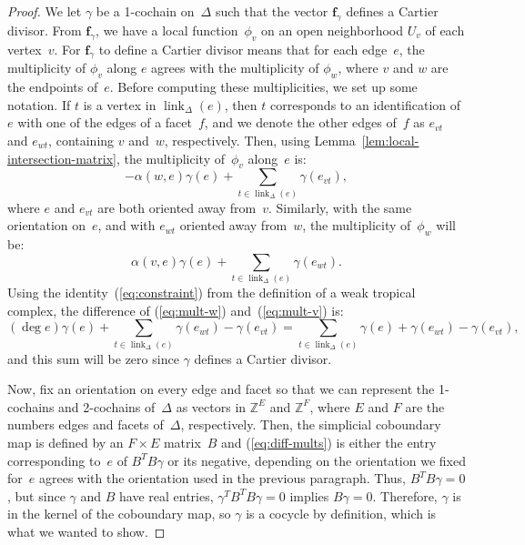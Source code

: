 \documentclass[11pt]{amsart}
\theoremstyle{definition}
\newcommand{\bff}{\mathbf f}
\newcommand{\link}{\operatorname{link}}
\newcommand{\ZZ}{\mathbb Z}
\begin{document}
\begin{proof}
We let $\gamma$ be a 1-cochain on~$\Delta$ such that the vector $\bff_\gamma$
defines a Cartier divisor. From $\bff_\gamma$, we have a local function~$\phi_v$
on an open neighborhood $U_v$ of each vertex~$v$. For $\bff_\gamma$ to define a
Cartier divisor means that for each edge~$e$, the multiplicity of $\phi_v$ along
$e$ agrees with the multiplicity of $\phi_w$, where $v$ and $w$ are the
endpoints of~$e$. Before computing these multiplicities, we set up some
notation. If
$t$ is a vertex in $\link_\Delta(e)$, then $t$ corresponds to an identification
of $e$ with one of the edges of a facet~$f$, and we denote the other edges
of~$f$ as $e_{vt}$ and $e_{wt}$, containing $v$ and~$w$, respectively.
Then, using Lemma~\ref{lem:local-intersection-matrix}, the multiplicity of~$\phi_v$ along~$e$
is:
\begin{equation}\label{eq:mult-v}
-\alpha(w, e) \gamma(e) + \sum_{t \in \link_\Delta(e)} \gamma(e_{vt}),
\end{equation}
where $e$ and $e_{vt}$ are both oriented away from~$v$. Similarly, with the same
orientation on~$e$, and with $e_{wt}$ oriented away from~$w$, the multiplicity
of~$\phi_w$ will be:
\begin{equation}\label{eq:mult-w}
\alpha(v, e) \gamma(e) + \sum_{t \in \link_\Delta(e)} \gamma(e_{wt}).
\end{equation}
Using the identity~(\ref{eq:constraint}) from the definition of a weak tropical
complex, the difference of (\ref{eq:mult-w}) and~(\ref{eq:mult-v}) is:
\begin{equation}\label{eq:diff-mults}
(\deg e) \gamma(e) + \sum_{t \in \link_\Delta(e)} \gamma(e_{wt}) -
\gamma(e_{vt})
 = \sum_{t \in \link_\Delta(e)} \gamma(e) + \gamma(e_{wt}) - \gamma(e_{vt}),
\end{equation}
and this sum will be zero since $\gamma$ defines a Cartier divisor.

Now, fix an orientation on every edge and facet so that we can represent the
1-cochains and 2-cochains of~$\Delta$ as vectors in $\ZZ^E$ and $\ZZ^F$, where
$E$ and $F$ are the numbers edges and facets of~$\Delta$, respectively. Then,
the simplicial coboundary map is defined by an $F \times E$ matrix~$B$
and (\ref{eq:diff-mults}) is either the entry corresponding to~$e$ of
$B^T B \gamma$
or its negative, depending on the orientation we fixed for~$e$ agrees with
the orientation used in the previous paragraph. Thus, $B^TB \gamma = 0$, but since $\gamma$ and $B$ have
real entries, $\gamma^T B^T B \gamma = 0$ implies $B \gamma = 0$. Therefore,
$\gamma$ is in the kernel of the coboundary map, so $\gamma$ is a cocycle by
definition, which is what we wanted to show.
\end{proof}
\end{document}
